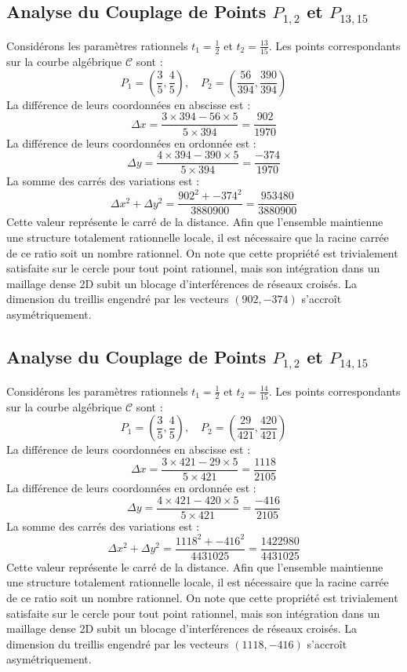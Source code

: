\documentclass[12pt, a4paper]{article}
\begin{document}
\subsection{Analyse du Couplage de Points $P_{1,2}$ et $P_{13,15}$}
Considérons les paramètres rationnels $t_1 = \frac{1}{2}$ et $t_2 = \frac{13}{15}$.
Les points correspondants sur la courbe algébrique $\mathcal{C}$ sont :
$$ P_1 = \left( \frac{3}{5}, \frac{4}{5} \right), \quad P_2 = \left( \frac{56}{394}, \frac{390}{394} \right) $$
La différence de leurs coordonnées en abscisse est :
$$ \Delta x = \frac{3 \times 394 - 56 \times 5}{5 \times 394} = \frac{902}{1970} $$
La différence de leurs coordonnées en ordonnée est :
$$ \Delta y = \frac{4 \times 394 - 390 \times 5}{5 \times 394} = \frac{-374}{1970} $$
La somme des carrés des variations est :
$$ \Delta x^2 + \Delta y^2 = \frac{ 902^2 + -374^2 }{ 3880900 } = \frac{ 953480 }{ 3880900 } $$
Cette valeur représente le carré de la distance. Afin que l'ensemble maintienne une structure totalement rationnelle locale, il est nécessaire que la racine carrée de ce ratio soit un nombre rationnel. On note que cette propriété est trivialement satisfaite sur le cercle pour tout point rationnel, mais son intégration dans un maillage dense 2D subit un blocage d'interférences de réseaux croisés. La dimension du treillis engendré par les vecteurs $( 902, -374 )$ s'accroît asymétriquement.


\subsection{Analyse du Couplage de Points $P_{1,2}$ et $P_{14,15}$}
Considérons les paramètres rationnels $t_1 = \frac{1}{2}$ et $t_2 = \frac{14}{15}$.
Les points correspondants sur la courbe algébrique $\mathcal{C}$ sont :
$$ P_1 = \left( \frac{3}{5}, \frac{4}{5} \right), \quad P_2 = \left( \frac{29}{421}, \frac{420}{421} \right) $$
La différence de leurs coordonnées en abscisse est :
$$ \Delta x = \frac{3 \times 421 - 29 \times 5}{5 \times 421} = \frac{1118}{2105} $$
La différence de leurs coordonnées en ordonnée est :
$$ \Delta y = \frac{4 \times 421 - 420 \times 5}{5 \times 421} = \frac{-416}{2105} $$
La somme des carrés des variations est :
$$ \Delta x^2 + \Delta y^2 = \frac{ 1118^2 + -416^2 }{ 4431025 } = \frac{ 1422980 }{ 4431025 } $$
Cette valeur représente le carré de la distance. Afin que l'ensemble maintienne une structure totalement rationnelle locale, il est nécessaire que la racine carrée de ce ratio soit un nombre rationnel. On note que cette propriété est trivialement satisfaite sur le cercle pour tout point rationnel, mais son intégration dans un maillage dense 2D subit un blocage d'interférences de réseaux croisés. La dimension du treillis engendré par les vecteurs $( 1118, -416 )$ s'accroît asymétriquement.
\end{document}
